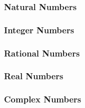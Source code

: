 \subsubsection{Natural Numbers}


\subsubsection{Integer Numbers}


\subsubsection{Rational Numbers}


\subsubsection{Real Numbers}


\subsubsection{Complex Numbers}
